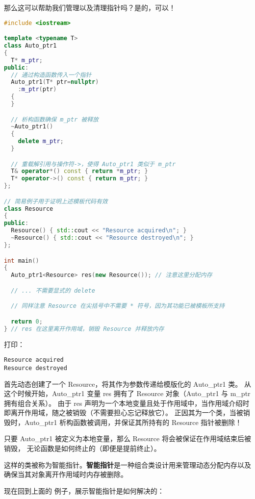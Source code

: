 \documentclass[../../LearnCpp.tex]{subfiles}
\begin{document}
那么这可以帮助我们管理以及清理指针吗？是的，可以！

\begin{lstlisting}[language=C++]
#include <iostream>

template <typename T>
class Auto_ptr1
{
  T* m_ptr;
public:
  // 通过构造函数传入一个指针
  Auto_ptr1(T* ptr=nullptr)
    :m_ptr(ptr)
  {
  }

  // 析构函数确保 m_ptr 被释放
  ~Auto_ptr1()
  {
    delete m_ptr;
  }

  // 重载解引用与操作符->，使得 Auto_ptr1 类似于 m_ptr
  T& operator*() const { return *m_ptr; }
  T* operator->() const { return m_ptr; }
};

// 简易例子用于证明上述模板代码有效
class Resource
{
public:
  Resource() { std::cout << "Resource acquired\n"; }
  ~Resource() { std::cout << "Resource destroyed\n"; }
};

int main()
{
  Auto_ptr1<Resource> res(new Resource()); // 注意这里分配内存

  // ... 不需要显式的 delete

  // 同样注意 Resource 在尖括号中不需要 * 符号，因为其功能已被模板所支持

  return 0;
} // res 在这里离开作用域，销毁 Resource 并释放内存
\end{lstlisting}

打印：

\begin{lstlisting}
Resource acquired
Resource destroyed
\end{lstlisting}

首先动态创建了一个 Resource，将其作为参数传递给模版化的 Auto\_ptr1 类。
从这个时候开始，Auto\_ptr1 变量 res 拥有了 Resource 对象（Auto\_ptr1 与 m\_ptr 拥有组合关系）。
由于 res 声明为一个本地变量且处于作用域中，当作用域介绍时即离开作用域，随之被销毁（不需要担心忘记释放它）。
正因其为一个类，当被销毁时，Auto\_ptr1 析构函数被调用，并保证其所持有的 Resource 指针被删除！

只要 Auto\_ptr1 被定义为本地变量，那么 Resource 将会被保证在作用域结束后被销毁，
无论函数是如何终止的（即便是提前终止）。

这样的类被称为智能指针。\textbf{智能指针}是一种组合类设计用来管理动态分配内存以及确保当其对象离开作用域时内存被删除。

现在回到上面的  例子，展示智能指针是如何解决的：
\end{document}

